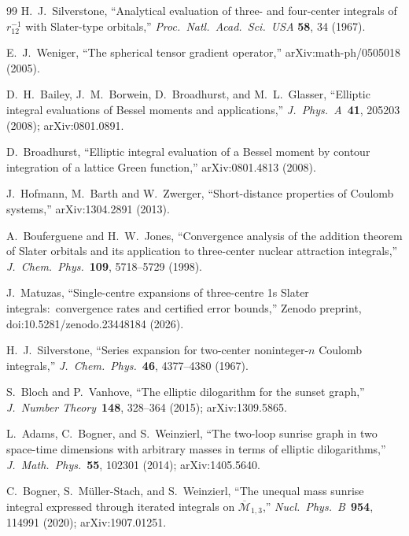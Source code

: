 \documentclass[aps,pra,twocolumn,superscriptaddress,longbibliography]{revtex4-2}
\begin{document}
\begin{thebibliography}{99}
H.~J.~Silverstone, ``Analytical evaluation of three- and four-center integrals of
$r_{12}^{-1}$ with Slater-type orbitals,'' \textit{Proc.\ Natl.\ Acad.\ Sci.\ USA}
\textbf{58}, 34 (1967).

E.~J.~Weniger, ``The spherical tensor gradient operator,'' arXiv:math-ph/0505018 (2005).

D.~H.~Bailey, J.~M.~Borwein, D.~Broadhurst, and M.~L.~Glasser, ``Elliptic
integral evaluations of Bessel moments and applications,''
\textit{J.\ Phys.\ A}\ \textbf{41}, 205203 (2008); arXiv:0801.0891.

D.~Broadhurst, ``Elliptic integral evaluation of a Bessel moment by contour
integration of a lattice Green function,'' arXiv:0801.4813 (2008).

J.~Hofmann, M.~Barth and W.~Zwerger, ``Short-distance properties of Coulomb systems,''
arXiv:1304.2891 (2013).

A.~Bouferguene and H.~W.~Jones, ``Convergence analysis of the addition theorem of Slater
orbitals and its application to three-center nuclear attraction integrals,''
\textit{J.\ Chem.\ Phys.}\ \textbf{109}, 5718--5729 (1998).

J.~Matuzas, ``Single-centre expansions of three-centre 1s Slater integrals:\ convergence rates
and certified error bounds,'' Zenodo preprint, doi:10.5281/zenodo.23448184 (2026).

H.~J.~Silverstone, ``Series expansion for two-center noninteger-$n$ Coulomb integrals,''
\textit{J.\ Chem.\ Phys.}\ \textbf{46}, 4377--4380 (1967).

S.~Bloch and P.~Vanhove, ``The elliptic dilogarithm for the sunset graph,''
\textit{J.\ Number Theory}\ \textbf{148}, 328--364 (2015); arXiv:1309.5865.

L.~Adams, C.~Bogner, and S.~Weinzierl, ``The two-loop sunrise graph in two
space-time dimensions with arbitrary masses in terms of elliptic
dilogarithms,'' \textit{J.\ Math.\ Phys.}\ \textbf{55}, 102301 (2014);
arXiv:1405.5640.

C.~Bogner, S.~M\"uller-Stach, and S.~Weinzierl, ``The unequal mass sunrise
integral expressed through iterated integrals on $\overline{\mathcal M}_{1,3}$,''
\textit{Nucl.\ Phys.\ B}\ \textbf{954}, 114991 (2020); arXiv:1907.01251.


\end{thebibliography}
\end{document}
